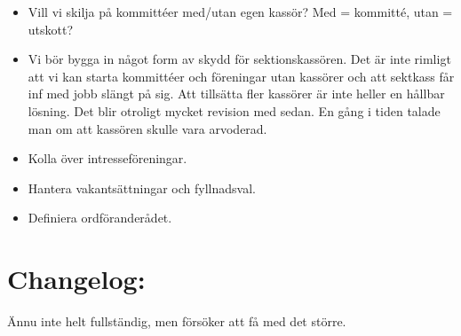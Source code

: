 \documentclass[a4paper]{dtek}
\begin{document}
\begin{itemize}
  \item Vill vi skilja på kommittéer med/utan egen kassör? Med = kommitté, utan = utskott?
  \item Vi bör bygga in något form av skydd för sektionskassören. Det är inte rimligt att vi kan starta kommittéer och föreningar utan kassörer och att sektkass får inf med jobb slängt på sig. Att tillsätta fler kassörer är inte heller en hållbar lösning. Det blir otroligt mycket revision med sedan. En gång i tiden talade man om att kassören skulle vara arvoderad.
  \item Kolla över intresseföreningar.
  \item Hantera vakantsättningar och fyllnadsval.
  \item Definiera ordföranderådet.
\end{itemize}
\section{Changelog:}
Ännu inte helt fullständig, men försöker att få med det större.
\end{document}
